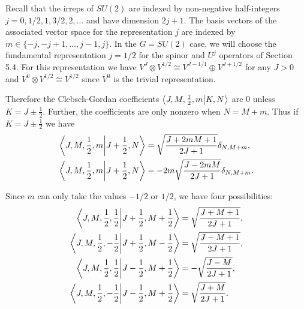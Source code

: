 \documentclass[11pt,reqno]{amsart}
\numberwithin{equation}{section}
\begin{document}
	Recall that the irreps of $SU(2)$ are indexed by non-negative half-integers $j=0,1/2,1,3/2,2,\ldots$ and have dimension $2j+1$.
	The basis vectors of the associated vector space for the representation $j$ are indexed by $m\in \{-j,-j+1,\ldots,j-1,j \}$.
	In the $G=SU(2)$ case, we will choose the fundamental representation $j=1/2$ for the spinor and $U^j$ operators of Section 5.4.
	For this representation we have $V^J \otimes V^{1/2} \cong V^{J-1/1}\oplus V^{J+1/2}$ for any $J>0$ and $V^0\otimes V^{1/2}\cong V^{1/2}$ since $V^0$ is the trivial representation.
	
	Therefore the Clebsch-Gordan coefficients $\braket{J,M,\frac{1}{2},m}{K,N}$ are $0$ unless $K=J\pm \frac{1}{2}$. 
	Further, the coefficients are only nonzero when $N=M+m$.
	Thus if $K=J\pm \frac{1}{2}$ we have 
	\begin{align}
		\braket{J,M,\frac{1}{2},m}{J+\frac{1}{2},N} &= \sqrt{\frac{J+2mM+1}{2J+1}} \delta_{N,M+m},\\
		 \braket{J,M,\frac{1}{2},m}{J+\frac{1}{2},N} &= -2m\sqrt{\frac{J-2mM}{2J+1}} \delta_{N,M+m}.
	\end{align}
	
	Since $m$ can only take the values $-1/2$ or $1/2$, we have four possibilities:	
	\begin{align}
		\braket{J,M,\frac{1}{2},\frac{1}{2}}{J+\frac{1}{2},M+\frac{1}{2}} &= \sqrt{\frac{J+M+1}{2J+1}} ,\\
		\braket{J,M,\frac{1}{2},-\frac{1}{2}}{J+\frac{1}{2},M-\frac{1}{2}} &= \sqrt{\frac{J-M+1}{2J+1}},\\
		\braket{J,M,\frac{1}{2},\frac{1}{2}}{J-\frac{1}{2},M+\frac{1}{2}} &= -\sqrt{\frac{J-M}{2J+1}},\\
		\braket{J,M,\frac{1}{2},-\frac{1}{2}}{J-\frac{1}{2},M+\frac{1}{2}} &= \sqrt{\frac{J+M}{2J+1}}.
	\end{align}
	
\end{document}
